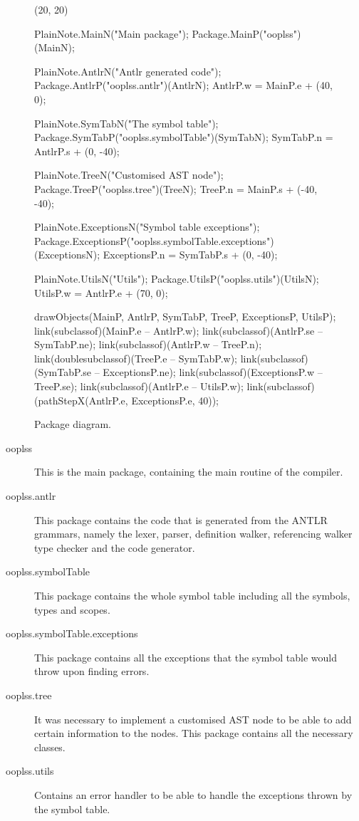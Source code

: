 \begin{figure}[H]
	\centering
	\begin{emp}[classdiag](20, 20)

	PlainNote.MainN("Main package");
	Package.MainP("ooplss")(MainN);

	PlainNote.AntlrN("Antlr generated code");
	Package.AntlrP("ooplss.antlr")(AntlrN);
	AntlrP.w = MainP.e + (40, 0);

	PlainNote.SymTabN("The symbol table");
	Package.SymTabP("ooplss.symbolTable")(SymTabN);
	SymTabP.n = AntlrP.s + (0, -40);

	PlainNote.TreeN("Customised AST node");
	Package.TreeP("ooplss.tree")(TreeN);
	TreeP.n = MainP.s + (-40, -40);

	PlainNote.ExceptionsN("Symbol table exceptions");
	Package.ExceptionsP("ooplss.symbolTable.exceptions")(ExceptionsN);
	ExceptionsP.n = SymTabP.s + (0, -40);

	PlainNote.UtilsN("Utils");
	Package.UtilsP("ooplss.utils")(UtilsN);
	UtilsP.w = AntlrP.e + (70, 0);

	drawObjects(MainP, AntlrP, SymTabP, TreeP, ExceptionsP, UtilsP);
	link(subclassof)(MainP.e -- AntlrP.w);
	link(subclassof)(AntlrP.se -- SymTabP.ne);
	link(subclassof)(AntlrP.w -- TreeP.n);
	link(doublesubclassof)(TreeP.e -- SymTabP.w);
	link(subclassof)(SymTabP.se -- ExceptionsP.ne);
	link(subclassof)(ExceptionsP.w -- TreeP.se);
	link(subclassof)(AntlrP.e -- UtilsP.w);
	link(subclassof)(pathStepX(AntlrP.e, ExceptionsP.e, 40));

	\end{emp}
	\caption{Package diagram.}
	\label{fig:packages}
\end{figure}


\begin{description}
\item[ooplss] This is the main package, containing the main routine of the
compiler.
\item[ooplss.antlr] This package contains the code that is generated from the
ANTLR grammars, namely the lexer, parser, definition walker, referencing walker
type checker and the code generator.
\item[ooplss.symbolTable] This package contains the whole symbol table including
all the symbols, types and scopes.
\item[ooplss.symbolTable.exceptions] This package contains all the exceptions
that the symbol table would throw upon finding errors.
\item[ooplss.tree] It was necessary to implement a customised AST node to be
able to add certain information to the nodes. This package contains all the
necessary classes.
\item[ooplss.utils] Contains an error handler to be able to handle the
exceptions thrown by the symbol table.
\end{description}

